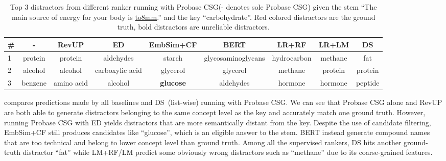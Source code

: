 \begin{table}[ht!]%
	\small
	\centering
		\begin{tabular}{lcccccccc} %
			\toprule
			\# &-  &RevUP &ED  & EmbSim+CF &BERT & LR+RF & LR+LM & \textbf{DS}\\
			\midrule
			1 &\color{red}protein   &\color{red}protein  &aldehydes  &starch &glycosaminoglycans  & hydrocarbon &methane    &\color{red} fat\\
			\midrule
			2 &alcohol  &alcohol  &carboxylic acid  &glycerol  &glycerol &methane  &\color{red}protein    &\color{red}protein \\
			\midrule
			3 &benzene  &amino acid  &alcohol   &\textbf{glucose}  &aldehydes &hormone  &hormone   &peptide \\
			\bottomrule
		\end{tabular}
		\caption{Top 3 distractors from different ranker running with Probase CSG(- denotes sole Probase CSG)
	given the stem ``The main source of energy for your body is \underline{\hbox to8mm{}}.'' and the key ``{\color{blue}carbohydrate}''. Red colored distractors are the ground truth, bold distractors are unreliable distractors.}
		\label{table:example}
	\end{table}
 compares predictions made by all baselines and DS~(list-wise) running with Probase CSG. We can see that Probase CSG alone and RevUP are both able to generate distractors belonging to the same concept level as the key and accurately match one ground truth. However, running Probase CSG with ED yields 
distractors that are more semantically distant from the key. 
Despite the use of candidate filtering, EmbSim+CF still produces candidates 
like ``glucose'', which is an eligible answer to the stem. 
BERT instead generate compound names that are too technical and belong to lower concept level than ground truth. 
Among all the supervised rankers, DS hits another ground-truth distractor 
``fat'' while LM+RF/LM predict some obviously wrong distractors 
such as ``methane'' due to its coarse-grained features.


